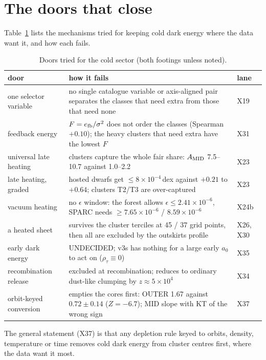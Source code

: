 \documentclass[10pt]{article}
\begin{document}
\section{The doors that close}
Table~\ref{tab:doors} lists the mechanisms tried for keeping cold dark energy where the data want it, and how each fails.

\begin{table}[h]\centering\small
\caption{Doors tried for the cold sector (both footings unless noted).}\label{tab:doors}
\begin{tabular}{p{}p{}l}
\toprule
door & how it fails & lane\\
\midrule
one selector variable & no single catalogue variable or axis-aligned pair separates the classes that need extra from those that need none & X19\\
feedback energy & $F=e_{\rm fb}/\sigma^2$ does not order the classes (Spearman $+0.10$); the heavy clusters that need extra have the lowest $F$ & X31\\
universal late heating & clusters capture the whole fair share: $A_{\rm MID}$ 7.5--10.7 against 1.0--2.2 & X23\\
late heating, graded & hosted dwarfs get $\le8\times10^{-4}$\,dex against $+0.21$ to $+0.64$; clusters T2/T3 are over-captured & X23\\
vacuum heating & no $\epsilon$ window: the forest allows $\epsilon\le2.41\times10^{-6}$, SPARC needs $\ge7.65\times10^{-6}$ / $8.59\times10^{-6}$ & X24b\\
a heated sheet & survives the cluster terciles at 45 / 37 grid points, then all are excluded by the outskirts profile & X26, X30\\
early dark energy & UNDECIDED; v3s has nothing for a large early $a_0$ to act on ($\rho_\tau\equiv0$) & X35\\
recombination release & excluded at recombination; reduces to ordinary dust-like clumping by $z\approx5\times10^4$ & X34\\
orbit-keyed conversion & empties the cores first: OUTER 1.67 against $0.72\pm0.14$ ($Z=-6.7$); MID slope with KT of the wrong sign & X37\\
\bottomrule
\end{tabular}
\end{table}

The general statement (X37) is that any depletion rule keyed to orbits, density, temperature or time removes cold dark energy from cluster centres first, where the data want it most.
\end{document}

